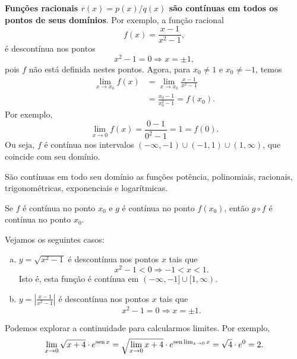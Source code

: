 \begin{ex}
  {\bf Funções racionais $r(x) = p(x)/q(x)$ são contínuas em todos os pontos de seus domínios}. Por exemplo, a função racional
  \begin{equation}
    f(x) = \frac{x-1}{x^2-1},
  \end{equation}
  é descontínua nos pontos
  \begin{equation}
    x^2-1 = 0 \Rightarrow x = \pm 1,
  \end{equation}
  pois $f$ não está definida nestes pontos. Agora, para $x_0\neq 1$ e $x_0\neq -1$, temos
  \begin{align}
    \lim_{x\to x_0} f(x) &= \lim_{x\to x_0} \frac{x-1}{x^2-1}\\
                         &= \frac{x_0-1}{x_0^2-1} = f(x_0).
  \end{align}
  Por exemplo,
  \begin{equation}
    \lim_{x\to 0} f(x) = \frac{0-1}{0^2-1} = 1 = f(0).
  \end{equation}
  Ou seja, $f$ é contínua nos intervalos $(-\infty, -1) \cup (-1, 1) \cup (1, \infty)$, que coincide com seu domínio.
\end{ex}

\begin{obs}
  São contínuas em todo seu domínio as funções potência, polinomiais, racionais, trigonométricas, exponenciais e logarítmicas.
\end{obs}

Se $f$ é contínua no ponto $x_0$ e $g$ é contínua no ponto $f(x_0)$, então $g\circ f$ é contínua no ponto $x_0$.

\begin{ex}
  Vejamos os seguintes casos:
  \begin{enumerate}[a)]
  \item $y = \sqrt{x^2-1}$ é descontínua nos pontos $x$ tais que
    \begin{equation}
      x^2-1<0\Rightarrow -1<x<1.
    \end{equation}
    Isto é, esta função é contínua em $(-\infty,-1]\cup[1,\infty)$.
  \item $\displaystyle y = \left|\frac{x-1}{x^2-1}\right|$ é descontínua nos pontos $x$ tais que
    \begin{equation}
      x^2-1=0\Rightarrow x=\pm 1.
    \end{equation}
  \end{enumerate}
\end{ex}

\begin{ex}
  Podemos explorar a continuidade para calcularmos limites. Por exemplo,
  \begin{equation}
    \lim_{x\to 0} \sqrt{x+4}\cdot e^{\operatorname{sen} x} = \sqrt{\lim_{x\to 0} x+4}\cdot e^{\operatorname{sen} \lim_{x\to 0} x} = \sqrt{4}\cdot e^{0} = 2.
  \end{equation}
\end{ex}

